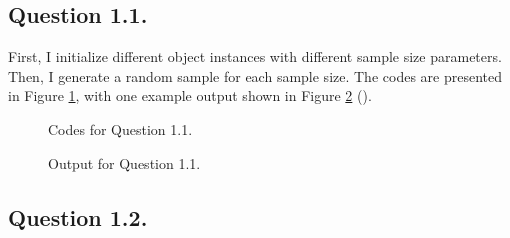 \documentclass[12pt]{article}
\newcommand{\highlightP}[1]{{\emph{\color{MyPink}{#1}}}}
\theoremstyle{definition}
\begin{document}
\newpage
\subsection{Question 1.1.}

First, I initialize different object instances with different sample size parameters. Then, I generate a random sample for each sample size. The codes are presented in Figure \ref{q1_1}, with one example output shown in Figure \ref{r1_1} (\highlightP{I don't show all the random sample, as they actually don't matter so much for subsequent key results but can greatly reduce the readability of this report.}). 

\begin{figure}[H]
    \noindent\caption{Codes for Question 1.1.}
    \begin{center}
        \label{q1_1}
    \end{center}
\end{figure}

\begin{figure}[H]
    \noindent\caption{Output for Question 1.1.}
    \begin{center}
        \label{r1_1}
    \end{center}
\end{figure}

\subsection{Question 1.2.}
\end{document}

